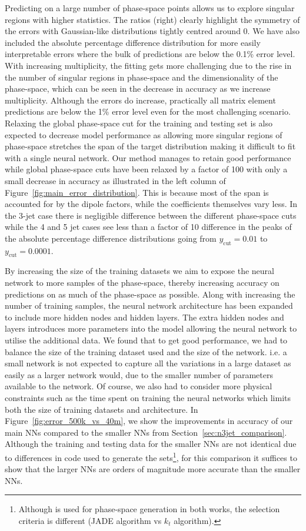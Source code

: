 \documentclass[main.tex]{subfiles}
\begin{document}
Predicting on a large number of phase-space points allows us to explore singular regions with higher statistics. 
The ratios (right) clearly highlight the symmetry of the errors with Gaussian-like distributions tightly centred around 0.
We have also included the absolute percentage difference distribution for more easily interpretable errors where the bulk of predictions are below the 0.1\% error level.
With increasing multiplicity, the fitting gets more challenging due to the rise in the number of singular regions in phase-space and the dimensionality of the phase-space, which can be seen in the decrease in accuracy as we increase multiplicity.
Although the errors do increase, practically all matrix element predictions are below the 1\% error level even for the most challenging scenario.
Relaxing the global phase-space cut for the training and testing set is also expected to decrease model performance as allowing more singular regions of phase-space stretches the span of the target distribution making it difficult to fit with a single neural network.
Our method manages to retain good performance while global phase-space cuts have been relaxed by a factor of 100 with only a small decrease in accuracy as illustrated in the left column of Figure~\ref{fig:main_error_distribution}.
This is because most of the span is accounted for by the dipole factors, while the coefficients themselves vary less.
In the 3-jet case there is negligible difference between the different phase-space cuts while the 4 and 5 jet cases see less than a factor of 10 difference in the peaks of the absolute percentage difference distributions going from $y_{\mathrm{cut}} = 0.01$ to $y_{\mathrm{cut}} = 0.0001$.

By increasing the size of the training datasets we aim to expose the neural network to more samples of the phase-space, thereby increasing accuracy on predictions on as much of the phase-space as possible.
Along with increasing the number of training samples, the neural network architecture has been expanded to include more hidden nodes and hidden layers.
The extra hidden nodes and layers introduces more parameters into the model allowing the neural network to utilise the additional data. 
We found that to get good performance, we had to balance the size of the training dataset used and the size of the network. i.e. a small network is not expected to capture all the variations in a large dataset as easily as a larger network would, due to the smaller number of parameters available to the network.
Of course, we also had to consider more physical constraints such as the time spent on training the neural networks which limits both the size of training datasets and architecture.
In Figure~\ref{fig:error_500k_vs_40m}, we show the improvements in accuracy of our main NNs compared to the smaller NNs from Section~\ref{sec:n3jet_comparison}.
Although the training and testing data for the smaller NNs are not identical due to differences in code used to generate the sets\footnote{Although {\RAMBO} is used for phase-space generation in both works, the selection criteria is different (JADE algorithm vs $k_{t}$ algorithm).}, for this comparison it suffices to show that the larger NNs are orders of magnitude more accurate than the smaller NNs.
\end{document}
